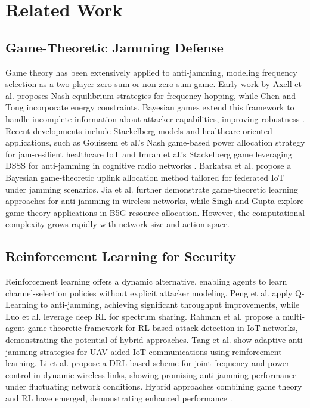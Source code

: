 \documentclass[conference]{IEEEtran}
\begin{document}
\section{Related Work}

\subsection{Game-Theoretic Jamming Defense}
Game theory has been extensively applied to anti-jamming, modeling frequency selection as a two-player zero-sum or non-zero-sum game. Early work by Axell et al. \cite{axell2012detection} proposes Nash equilibrium strategies for frequency hopping, while Chen and Tong \cite{chen2019anti} incorporate energy constraints. Bayesian games extend this framework to handle incomplete information about attacker capabilities, improving robustness \cite{alpcan2007game,khouzani2012evolving}. Recent developments include Stackelberg models and healthcare-oriented applications, such as Gouissem et al.'s Nash game-based power allocation strategy for jam-resilient healthcare IoT \cite{gouissem2022nash} and Imran et al.'s Stackelberg game leveraging DSSS for anti-jamming in cognitive radio networks \cite{imran2024stackelberg}. Barkatsa et al. \cite{barkatsa2024bayesian} propose a Bayesian game-theoretic uplink allocation method tailored for federated IoT under jamming scenarios. Jia et al. \cite{jia2022game} further demonstrate game-theoretic learning approaches for anti-jamming in wireless networks, while Singh and Gupta \cite{resource2023slicing} explore game theory applications in B5G resource allocation. However, the computational complexity grows rapidly with network size and action space.

\subsection{Reinforcement Learning for Security}
Reinforcement learning offers a dynamic alternative, enabling agents to learn channel-selection policies without explicit attacker modeling. Peng et al. \cite{peng2017anti} apply Q-Learning to anti-jamming, achieving significant throughput improvements, while Luo et al. \cite{luo2018anti} leverage deep RL for spectrum sharing. Rahman et al. \cite{rahman2023rlbased} propose a multi-agent game-theoretic framework for RL-based attack detection in IoT networks, demonstrating the potential of hybrid approaches. Tang et al. \cite{tang2024adaptive} show adaptive anti-jamming strategies for UAV-aided IoT communications using reinforcement learning. Li et al. \cite{li2022drl} propose a DRL-based scheme for joint frequency and power control in dynamic wireless links, showing promising anti-jamming performance under fluctuating network conditions. Hybrid approaches combining game theory and RL have emerged, demonstrating enhanced performance \cite{zhao2020hybrid,li2021game}.
\end{document}
